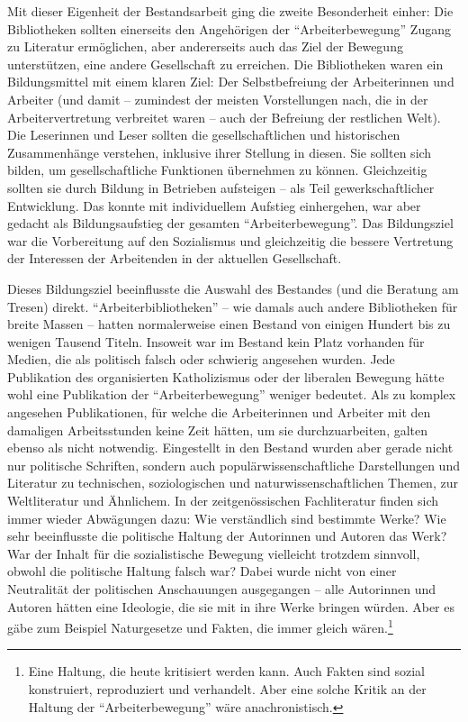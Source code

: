 \documentclass[a4paper,
fontsize=11pt,
oneside,
numbers=noperiodatend,
parskip=half-,
bibliography=totoc,
final
]{scrartcl}
\begin{document}
Mit dieser Eigenheit der Bestandsarbeit ging die zweite Besonderheit
einher: Die Bibliotheken sollten einerseits den Angehörigen der
\enquote{Arbeiterbewegung} Zugang zu Literatur ermöglichen, aber
andererseits auch das Ziel der Bewegung unterstützen, eine andere
Gesellschaft zu erreichen. Die Bibliotheken waren ein Bildungsmittel mit
einem klaren Ziel: Der Selbstbefreiung der Arbeiterinnen und Arbeiter
(und damit -- zumindest der meisten Vorstellungen nach, die in der
Arbeitervertretung verbreitet waren -- auch der Befreiung der restlichen
Welt). Die Leserinnen und Leser sollten die gesellschaftlichen und
historischen Zusammenhänge verstehen, inklusive ihrer Stellung in
diesen. Sie sollten sich bilden, um gesellschaftliche Funktionen
übernehmen zu können. Gleichzeitig sollten sie durch Bildung in
Betrieben aufsteigen -- als Teil gewerkschaftlicher Entwicklung. Das
konnte mit individuellem Aufstieg einhergehen, war aber gedacht als
Bildungsaufstieg der gesamten \enquote{Arbeiterbewegung}. Das
Bildungsziel war die Vorbereitung auf den Sozialismus und gleichzeitig
die bessere Vertretung der Interessen der Arbeitenden in der aktuellen
Gesellschaft.

Dieses Bildungsziel beeinflusste die Auswahl des Bestandes (und die
Beratung am Tresen) direkt. \enquote{Arbeiterbibliotheken} -- wie damals
auch andere Bibliotheken für breite Massen -- hatten normalerweise einen
Bestand von einigen Hundert bis zu wenigen Tausend Titeln. Insoweit war
im Bestand kein Platz vorhanden für Medien, die als politisch falsch
oder schwierig angesehen wurden. Jede Publikation des organisierten
Katholizismus oder der liberalen Bewegung hätte wohl eine Publikation
der \enquote{Arbeiterbewegung} weniger bedeutet. Als zu komplex
angesehen Publikationen, für welche die Arbeiterinnen und Arbeiter mit
den damaligen Arbeitsstunden keine Zeit hätten, um sie durchzuarbeiten,
galten ebenso als nicht notwendig. Eingestellt in den Bestand wurden
aber gerade nicht nur politische Schriften, sondern auch
populärwissenschaftliche Darstellungen und Literatur zu technischen,
soziologischen und naturwissenschaftlichen Themen, zur Weltliteratur und
Ähnlichem. In der zeitgenössischen Fachliteratur finden sich immer
wieder Abwägungen dazu: Wie verständlich sind bestimmte Werke? Wie sehr
beeinflusste die politische Haltung der Autorinnen und Autoren das Werk?
War der Inhalt für die sozialistische Bewegung vielleicht trotzdem
sinnvoll, obwohl die politische Haltung falsch war? Dabei wurde nicht
von einer Neutralität der politischen Anschauungen ausgegangen -- alle
Autorinnen und Autoren hätten eine Ideologie, die sie mit in ihre Werke
bringen würden. Aber es gäbe zum Beispiel Naturgesetze und Fakten, die
immer gleich wären.\footnote{Eine Haltung, die heute kritisiert werden
  kann. Auch Fakten sind sozial konstruiert, reproduziert und
  verhandelt. Aber eine solche Kritik an der Haltung der
  \enquote{Arbeiterbewegung} wäre anachronistisch.}
\end{document}
